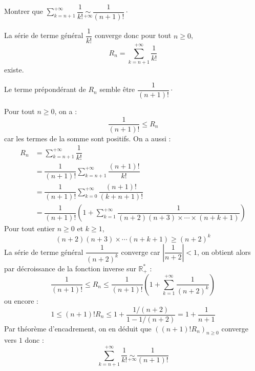 \documentclass[a4paper,10pt]{report}
\newcommand{\Sum}[2]{\ensuremath{\textstyle{\sum\limits_{#1}^{#2}}}}
\begin{document}
\medskip


\begin{Exercice}{} Montrer que $\Sum{k=n+1}{+ \infty} \dfrac{1}{k!} \underset{ + \infty}{\sim} \dfrac{1}{(n+1)!} \cdot$ \end{Exercice}

\corr La série de terme général $\dfrac{1}{k!}$ converge donc pour tout $n \geq 0$,
$$ R_n = \sum_{k=n+1}^{+ \infty} \dfrac{1}{k!}$$
existe. 

\medskip

\noindent Le terme prépondérant de $R_n$ semble être $\dfrac{1}{(n+1)!}\cdot$

\medskip

\noindent Pour tout $n \geq 0$, on a :
$$ \dfrac{1}{(n+1)!} \leq R_n$$
car les termes de la somme sont positifs. On a aussi :
\begin{align*}
R_n & = \sum_{k=n+1}^{+ \infty} \dfrac{1}{k!} \\
& = \dfrac{1}{(n+1)!} \sum_{k=n+1}^{+ \infty} \dfrac{(n+1)!}{k!} \\
& = \dfrac{1}{(n+1)!} \sum_{k=0}^{+ \infty} \dfrac{(n+1)!}{(k+n+1)!} \\
& = \dfrac{1}{(n+1)!} \left(1 + \sum_{k=1}^{+ \infty} \dfrac{1}{(n+2)(n+3) \times \cdots \times (n+k+1)} \right)
\end{align*}
Pour tout entier $n \geq 0$ et $k \geq 1$,
$$ (n+2)(n+3) \times \cdots (n+k+1) \geq (n+2)^k$$
La série de terme général $\dfrac{1}{(n+2)^k}$ converge car $\left\vert \dfrac{1}{n+2} \right\vert<1$, on obtient alors par décroissance de la fonction inverse sur $\mathbb{R}_+^*$ :
$$ \dfrac{1}{(n+1)!} \leq R_n \leq \dfrac{1}{(n+1)!} \left(1+ \sum_{k=1}^{+ \infty} \dfrac{1}{(n+2)^k} \right)$$
ou encore :
$$ 1 \leq (n+1)! R_n \leq 1 + \dfrac{1/(n+2)}{1-1/(n+2)} = 1 + \dfrac{1}{n+1}$$
Par théorème d'encadrement, on en déduit que $((n+1)! R_n)_{n \geq 0}$ converge vers $1$ donc :
$$ \sum_{k=n+1}^{+ \infty} \dfrac{1}{k!} \underset{ + \infty}{\sim} \dfrac{1}{(n+1)!}$$
\end{document}
